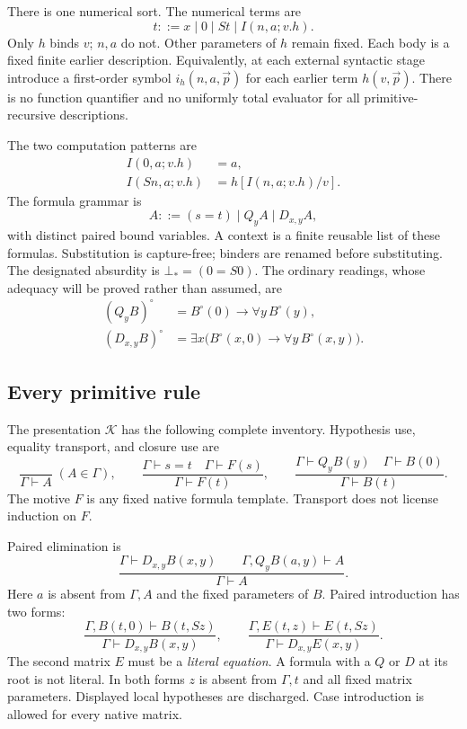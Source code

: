 \documentclass[11pt,letterpaper]{article}
\theoremstyle{definition}\newtheorem{definition}[theorem]{Definition}
\theoremstyle{remark}\newtheorem{remark}[theorem]{Remark}
\newcommand{\Kcal}{\mathcal K}
\begin{document}
There is one numerical sort. The numerical terms are
\[
 t::=x\mid 0\mid St\mid I(n,a;v.h).
\]
Only $h$ binds $v$; $n,a$ do not. Other parameters of $h$ remain fixed.
Each body is a fixed finite earlier description. Equivalently, at each
external syntactic stage introduce a first-order symbol $i_h(n,a,\vec p)$
for each earlier term $h(v,\vec p)$. There is no function quantifier and
no uniformly total evaluator for all primitive-recursive descriptions.

The two computation patterns are
\begin{align}
 I(0,a;v.h)&=a,\tag{I0}\label{eq:I0}\\
 I(Sn,a;v.h)&=h[I(n,a;v.h)/v].\tag{IS}\label{eq:IS}
\end{align}
The formula grammar is
\[
 A::=(s=t)\mid Q_yA\mid D_{x,y}A,
\]
with distinct paired bound variables. A context is a finite reusable
list of these formulas. Substitution is capture-free; binders are renamed
before substituting. The designated absurdity is $\bot_*=(0=S0)$.
The ordinary readings, whose adequacy will be proved rather than assumed,
are
\begin{align*}
 (Q_yB)^\circ&=B^\circ(0)\to\forall y\,B^\circ(y),\\
 (D_{x,y}B)^\circ&=\exists x\bigl(B^\circ(x,0)\to
                                  \forall y\,B^\circ(x,y)\bigr).
\end{align*}

\subsection{Every primitive rule}

The presentation $\Kcal$ has the following complete inventory.
Hypothesis use, equality transport, and closure use are
\[
 \frac{}{\Gamma\vdash A}\;(A\in\Gamma),\qquad
 \frac{\Gamma\vdash s=t\quad\Gamma\vdash F(s)}
      {\Gamma\vdash F(t)},\qquad
 \frac{\Gamma\vdash Q_yB(y)\quad\Gamma\vdash B(0)}
      {\Gamma\vdash B(t)}.
 \tag{Hyp, Tr, QE}
\]
The motive $F$ is any fixed native formula template. Transport does not
license induction on $F$.

Paired elimination is
\[
 \frac{\Gamma\vdash D_{x,y}B(x,y)\qquad
       \Gamma,Q_yB(a,y)\vdash A}
      {\Gamma\vdash A}.
 \tag{DE}
\]
Here $a$ is absent from $\Gamma,A$ and the fixed parameters of $B$.
Paired introduction has two forms:
\[
 \frac{\Gamma,B(t,0)\vdash B(t,Sz)}
      {\Gamma\vdash D_{x,y}B(x,y)},
 \qquad
 \frac{\Gamma,E(t,z)\vdash E(t,Sz)}
      {\Gamma\vdash D_{x,y}E(x,y)}.
 \tag{DI-case, DI-progress}
\]
The second matrix $E$ must be a \emph{literal equation}. A formula with a
$Q$ or $D$ at its root is not literal. In both forms $z$ is absent from
$\Gamma,t$ and all fixed matrix parameters. Displayed local hypotheses
are discharged. Case introduction is allowed for every native matrix.
\end{document}
